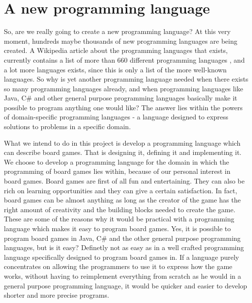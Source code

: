 \chapter{A new programming language}
\label{chap:introduction}

So, are we really going to create a new programming language? At this very
moment, hundreds maybe thousands of new programming languages are being created.
A Wikipedia article about the programming languages that exists, currently
contains a list of more than 660 different programming languages
\cite{listofprogramminglanguages}, and a lot more languages exists, since this
is only a list of the more well-known languages. So why is yet another
programming language needed when there exists so many programming languages
already, and when programming languages like Java, C\# and other general purpose
programming languages basically make it possible to program anything one would
like? The answer lies within the powers of domain-specific programming languages
- a language designed to express solutions to problems in a specific domain.
\cite{domainspecificprogramminglanguagedefinition}

What we intend to do in this project is develop a programming language which can
describe board games. That is designing it, defining it and implementing it. We
choose to develop a programming language for the domain in which the programming
of board games lies within, because of our personal interest in board games.
Board games are first of all fun and entertaining. They can also be rich on
learning opportunities \cite{whyboardgames1?} and they can give a certain
satisfaction. \cite{whyboardgames2?} In fact, board games can be almost anything
as long as the creator of the game has the right amount of creativity and the
building blocks needed to create the game. These are some of the reasons why it
would be practical with a programming language which makes it easy to program
board games. Yes, it is possible to program board games in Java, C\# and the
other general purpose programming languages, but is it easy? Definetly not as
easy as in a well crafted programming language specifically designed to program
board games in. If a language purely concentrates on allowing the programmers to
use it to express how the game works, without having to reimplement everything
from scratch as he would in a general purpose programming language, it would be
quicker and easier to develop shorter and more precise programs.  

